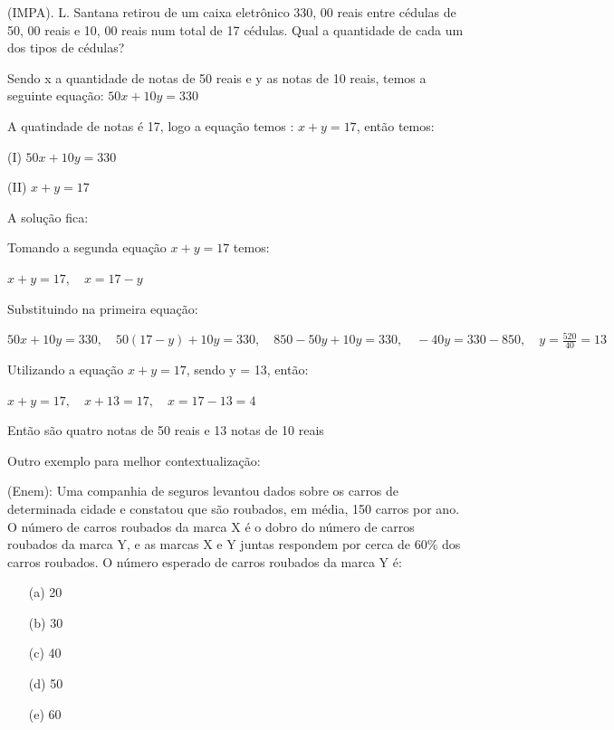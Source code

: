 \begin{multicols*}{2}
            (IMPA). L. Santana retirou de um caixa eletrônico 330, 00 reais entre cédulas de 50, 00 reais e 		10, 00 reais num total de 17 cédulas. Qual a quantidade de cada um dos tipos de cédulas? 
            
            Sendo x a quantidade de notas de 50 reais e y as notas de 10 reais, temos a seguinte equação:
            $50x + 10y = 330$
            
            A quatindade de notas é 17, logo a equação temos : $x + y = 17$, então temos:
            
            (I) $50x + 10y = 330$
            
            (II) $x + y = 17$
            
            A solução fica:
            
            Tomando a segunda equação $x + y = 17$ temos:
            
            $x + y = 17, \quad x = 17 - y$
            
            Substituindo na primeira equação:
            
            $50x + 10y = 330, \quad 50(17 - y) + 10y = 330, \quad 850 - 50y + 10y = 330, \quad 
            -40y = 330 - 850, \quad y = \frac{520}{40} = 13$
            
            Utilizando a equação $x + y = 17$, sendo y = 13, então: 
            
            $x + y = 17, \quad x + 13 = 17, \quad x = 17 - 13 = 4$
            
            Então são quatro notas de 50 reais e 13 notas de 10 reais
            
            Outro exemplo para melhor contextualização:
            
            (Enem): Uma companhia de seguros levantou dados sobre os carros de determinada cidade e 				constatou que são roubados, em média, 150 carros por ano. O número de carros roubados da marca 			X é o dobro do número de carros roubados da marca Y, e as marcas X e Y juntas respondem por 			cerca de 60\% dos carros roubados. O número esperado de carros roubados da marca Y é:
            \begin{itemize}
            \item[(a)] 20
            \item[(b)] 30
            \item[(c)] 40
            \item[(d)] 50
            \item[(e)] 60
            \end{itemize}
            

\end{multicols*}

